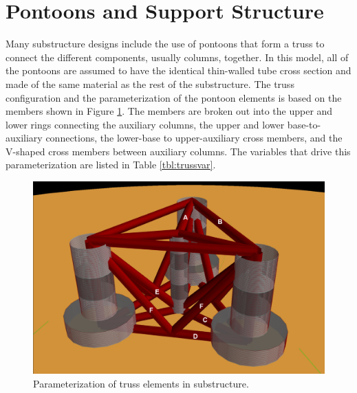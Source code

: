 \section{Pontoons and Support Structure}
Many substructure designs include the use of pontoons that form a truss
to connect the different components, usually columns, together.  In this
model, all of the pontoons are assumed to have the identical thin-walled
tube cross section and made of the same material as the rest of the
substructure.  The truss configuration and the parameterization of the
pontoon elements is based on the members shown in Figure
\ref{fig:pontoon}.  The members are broken out into the upper and lower
rings connecting the auxiliary columns, the upper and lower
base-to-auxiliary connections, the lower-base to upper-auxiliary cross
members, and the V-shaped cross members between auxiliary columns.  The
variables that drive this parameterization are listed in Table
\ref{tbl:trussvar}.
%
\begin{figure}[htb]
  \begin{center}
    \includegraphics[width=4.5in]{figs/semi}
    \caption{Parameterization of truss elements in substructure.}
    \label{fig:pontoon}
  \end{center}
\end{figure}
%
